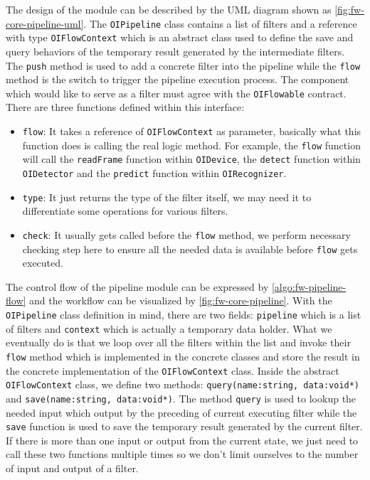 The design of the module can be described by the UML diagram shown as
\autoref{fig:fw-core-pipeline-uml}. The \texttt{OIPipeline} class contains a
list of filters and a reference with type \texttt{OIFlowContext} which is an
abstract class used to define the save and query behaviors of the temporary
result generated by the intermediate filters. The \texttt{push} method is used
to add a concrete filter into the pipeline while the \texttt{flow} method is the
switch to trigger the pipeline execution process.
The component which would like to serve as a filter must agree with the
\texttt{OIFlowable} contract. There are three functions defined within this
interface:

\begin{itemize}
    \item \texttt{flow}: It takes a reference of \texttt{OIFlowContext} as
    parameter, basically what this function does is calling the real logic
    method. For example, the \texttt{flow} function will call the
    \texttt{readFrame} function within \texttt{OIDevice}, the \texttt{detect}
    function within \texttt{OIDetector} and the \texttt{predict} function
    within \texttt{OIRecognizer}.

    \item \texttt{type}: It just returns the type of the filter itself, we may
    need it to differentiate some operations for various filters.

    \item \texttt{check}: It usually gets called before the \texttt{flow} method,
    we perform necessary checking step here to ensure all the needed data is
    available before \texttt{flow} gets executed.
\end{itemize}

The control flow of the pipeline module can be expressed by
\autoref{algo:fw-pipeline-flow} and the workflow can be visualized by
\autoref{fig:fw-core-pipeline}. With the \texttt{OIPipeline} class
definition in mind, there are two fields: \texttt{pipeline} which is a list of
filters and \texttt{context} which is actually a temporary data holder.
What we eventually do is that we loop over all the filters within the list and
invoke their \texttt{flow} method which is implemented in the concrete
classes and store the result in the concrete implementation of the
\texttt{OIFlowContext} class.
Inside the abstract \texttt{OIFlowContext} class, we define two methods:
\texttt{query(name:string, data:void*)} and \texttt{save(name:string,
data:void*)}. The method \texttt{query} is used to lookup the needed input
which output by the preceding of current executing filter while the
\texttt{save} function is used to save the temporary result generated by
the current filter. If there is more than one input or output from the current state,
we just need to call these two functions multiple times so we don't limit
ourselves to the number of input and output of a filter.

